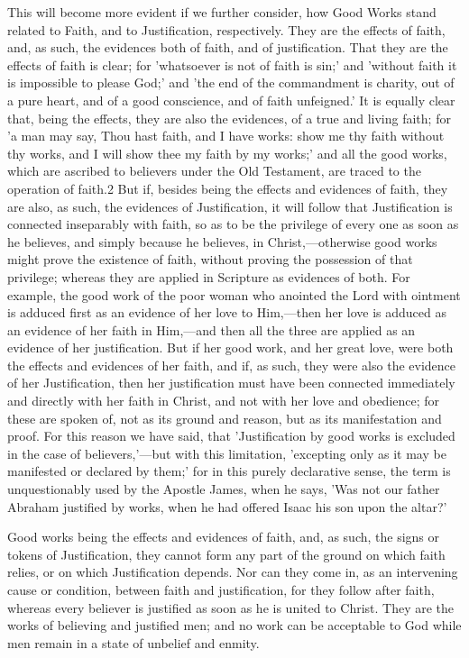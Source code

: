 \documentclass[
]{book}
\begin{document}
This will become more evident if we further consider, how Good Works stand related to Faith, and to Justification, respectively. They are the effects of faith, and, as such, the evidences both of faith, and of justification. That they are the effects of faith is clear; for 'whatsoever is not of faith is sin;' and 'without faith it is impossible to please God;' and 'the end of the commandment is charity, out of a pure heart, and of a good conscience, and of faith unfeigned.' It is equally clear that, being the effects, they are also the evidences, of a true and living faith; for 'a man may say, Thou hast faith, and I have works: show me thy faith without thy works, and I will show thee my faith by my works;' and all the good works, which are ascribed to believers under the Old Testament, are traced to the operation of faith.2 But if, besides being the effects and evidences of faith, they are also, as such, the evidences of Justification, it will follow that Justification is connected inseparably with faith, so as to be the privilege of every one as soon as he believes, and simply because he believes, in Christ,---otherwise good works might prove the existence of faith, without proving the possession of that privilege; whereas they are applied in Scripture as evidences of both. For example, the good work of the poor woman who anointed the Lord with ointment is adduced first as an evidence of her love to Him,---then her love is adduced as an evidence of her faith in Him,---and then all the three are applied as an evidence of her justification. But if her good work, and her great love, were both the effects and evidences of her faith, and if, as such, they were also the evidence of her Justification, then her justification must have been connected immediately and directly with her faith in Christ, and not with her love and obedience; for these are spoken of, not as its ground and reason, but as its manifestation and proof. For this reason we have said, that 'Justification by good works is excluded in the case of believers,'---but with this limitation, 'excepting only as it may be manifested or declared by them;' for in this purely declarative sense, the term is unquestionably used by the Apostle James, when he says, 'Was not our father Abraham justified by works, when he had offered Isaac his son upon the altar?'

Good works being the effects and evidences of faith, and, as such, the signs or tokens of Justification, they cannot form any part of the ground on which faith relies, or on which Justification depends. Nor can they come in, as an intervening cause or condition, between faith and justification, for they follow after faith, whereas every believer is justified as soon as he is united to Christ. They are the works of believing and justified men; and no work can be acceptable to God while men remain in a state of unbelief and enmity.
\end{document}
